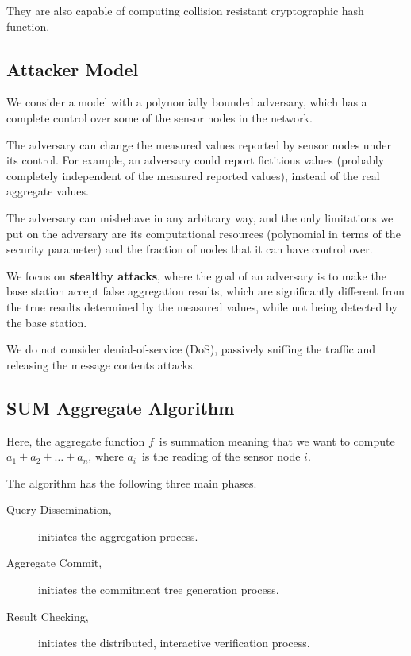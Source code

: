 \documentclass[%
  slidesonly,%
  semlayer%
  ]{seminar}                                  %
\begin{document}
\begin{slide}
      They are also capable of computing collision resistant cryptographic hash function.
      \clearpage

    \subsection*{Attacker Model}
      We consider a model with a polynomially bounded adversary, which has a complete control over some of the sensor nodes in the network.

      The adversary can change the measured values reported by sensor nodes under its control.
      For example, an adversary could report fictitious values (probably completely independent of the measured reported values), instead of the real aggregate values.

      The adversary can misbehave in any arbitrary way, and the only limitations we put on the adversary are its computational resources (polynomial in terms of the security parameter) and the fraction of nodes that it can have control over. 
   
      We focus on \textbf{stealthy attacks}, where the goal of an adversary is to make the base station accept false aggregation results, which are significantly different from the true results determined by the measured values, while not being detected by the base station.
      
      We do not consider denial-of-service (DoS), passively sniffing the traffic and releasing the message contents attacks.
      \clearpage

    \subsection*{SUM Aggregate Algorithm}
      Here, the aggregate function $f$\ is summation meaning that we want to compute $a_{1} + a_{2} + \dotsc + a_{n}$, where $a_{i}$\ is the reading of the sensor node $i$.
 
      The algorithm has the following three main phases.
      \begin{description}
        \item [Query Dissemination,] initiates the aggregation process.
        \item [Aggregate Commit,] initiates the commitment tree generation process.
        \item [Result Checking,] initiates the distributed, interactive verification process.
      \end{description}
      \clearpage


\end{slide}
\end{document}
